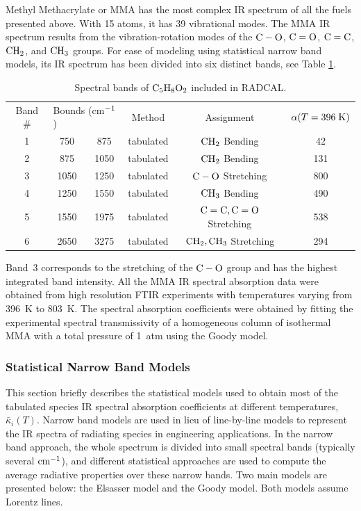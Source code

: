 Methyl Methacrylate or MMA has the most complex IR spectrum of all the fuels presented above. With 15 atoms, it has 39 vibrational modes. The MMA IR spectrum results from the vibration-rotation modes of the $\rm C-O$, $\rm C=O$, $\rm C=C$, $\rm CH_2$, and $\rm CH_3$ groups. For ease of modeling using statistical narrow band models, its IR spectrum has been divided into six distinct bands, see Table \ref{Table::C5H8O2}.
\begin{table}[ht]
   \centering
   \caption{Spectral bands of $\rm C_5H_8O_2$ included in RADCAL.}
   \vspace{0.1in}
   \label{Table::C5H8O2}
    \begin{tabular}{|c|c|c|c|c|c|}
    \hline
    Band \# & \multicolumn{2}{|l|}{Bounds (cm$\rm ^{-1}$) } & Method & Assignment &  $\alpha(T=396 \; {\rm K})$ \\
    \cline{1-6}
    1 & 750  & 875  & tabulated & $\rm CH_2$ Bending          & 42   \\
    2 & 875  & 1050 & tabulated & $\rm CH_2$ Bending          & 131  \\
    3 & 1050 & 1250 & tabulated & $\rm C-O$ Stretching        & 800  \\
    4 & 1250 & 1550 & tabulated & $\rm CH_3$ Bending          & 490  \\
    5 & 1550 & 1975 & tabulated & $\rm C=C, C=O$ Stretching   & 538  \\
    6 & 2650 & 3275 & tabulated & $\rm CH_2, CH_3$ Stretching & 294  \\
    \hline
   \end{tabular}
\end{table}
Band~3 corresponds to the stretching of the $\rm C-O$ group and has the highest integrated band intensity. All the MMA IR spectral absorption data were obtained from high resolution FTIR experiments with temperatures varying from 396~K to 803~K. The spectral absorption coefficients were obtained by fitting the experimental spectral transmissivity of a homogeneous column of isothermal MMA with a total pressure of 1~atm using the Goody model.

\subsubsection{Statistical Narrow Band Models}

This section briefly describes the statistical models used to obtain most of the
tabulated species IR spectral absorption coefficients at different temperatures,
$\bar{\kappa}_i(T)$. Narrow band models are used in lieu of line-by-line models to
represent the IR spectra of radiating species in engineering applications. In the narrow band approach, the whole spectrum is
divided into small spectral bands (typically several $\rm cm^{-1}$), and
different statistical approaches are used to compute the average radiative
properties over these narrow bands. Two main models are presented below: the
Elsasser model and the Goody model. Both models assume Lorentz lines.

